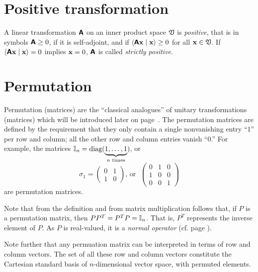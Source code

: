 \section{Positive transformation}

A linear transformation  $\textsf{\textbf{A}}$ on an inner product space ${\frak V}$ is {\em positive},
that is in symbols $\textsf{\textbf{A}}\ge 0$, if it is self-adjoint,
and if $\langle \textsf{\textbf{A}}{\bf x}\mid {\bf x}\rangle  \ge 0$ for all ${\bf x}\in {\frak V}$.
If  $\langle \textsf{\textbf{A}}{\bf x}\mid {\bf x}\rangle = 0$ implies
${\bf x}=0$, $\textsf{\textbf{A}}$ is called {\em strictly positive}.


\section{Permutation}

Permutation (matrices) are the ``classical analogues'' \cite{mermin-04,mermin-07}
of unitary transformations (matrices) which will be introduced later on page~\pageref{2014-m-ch-fdvs-unitary}.
The permutation matrices are defined by the requirement that they only contain a single nonvanishing entry ``$1$'' per row and column;
all the other row and column entries vanish ``$0$.''
For example, the matrices ${\Bbb I}_n=\textrm{diag}(\underbrace{1,\ldots ,1}_{n \textrm{ times}})$,
or
$$
\sigma_1=
\begin{pmatrix}
0&1\\
1&0
\end{pmatrix}
\textrm{, or }\;
\begin{pmatrix}
0&1&0\\
1&0&0\\
0&0&1
\end{pmatrix}
$$
are permutation matrices.

Note that from the definition and from matrix multiplication follows that,
if $P$ is a permutation matrix, then $PP^T=P^T P={\Bbb I}_n$.
That is, $P^T$ represents the inverse element of $P$.
As $P$ is real-valued, it is a {\em normal operator} (cf. page \pageref{2014-m-fdvs-normality}).


Note further that any permuation matrix can be interpreted in terms of row and column vectors.
The set of all these row and column vectors constitute the Cartesian standard basis of $n$-dimensional vector space,
with permuted elements.


